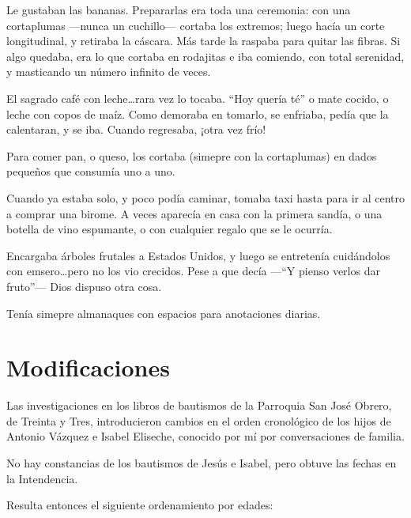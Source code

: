 \documentclass{article}
\begin{document}
Le gustaban las bananas. Prepararlas era toda una ceremonia: con una cortaplumas ---nunca un cuchillo--- cortaba los extremos; luego hacía un corte longitudinal, y retiraba la cáscara. Más tarde la raspaba para quitar las fibras. Si algo quedaba, era lo que cortaba en rodajitas e iba comiendo, con total serenidad, y masticando un número infinito de veces.

El sagrado café con leche\ldots rara vez lo tocaba. ``Hoy quería té'' o mate cocido, o leche con copos de maíz. Como demoraba en tomarlo, se enfriaba, pedía que la calentaran, y se iba. Cuando regresaba, ¡otra vez frío!

Para comer pan, o queso, los cortaba (simepre con la cortaplumas) en dados pequeños que consumía uno a uno.

Cuando ya estaba solo, y poco podía caminar, tomaba taxi hasta para ir al centro a comprar una birome. A veces aparecía en casa con la primera sandía, o una botella de vino espumante, o con cualquier regalo que se le ocurría.

Encargaba árboles frutales a Estados Unidos, y luego se entretenía cuidándolos con emsero\ldots pero no los vio crecidos. Pese a que decía ---``Y pienso verlos dar fruto''--- Dios dispuso otra cosa.

Tenía simepre almanaques con espacios para anotaciones diarias.

\section{Modificaciones}

Las investigaciones en los libros de bautismos de la Parroquia San José Obrero, de Treinta y Tres, introducieron cambios en el orden cronológico de los hijos de Antonio Vázquez e Isabel Eliseche, conocido por mí por conversaciones de familia.

No hay constancias de los bautismos de Jesús e Isabel, pero obtuve las fechas en la Intendencia.

Resulta entonces el siguiente ordenamiento por edades:
\end{document}
